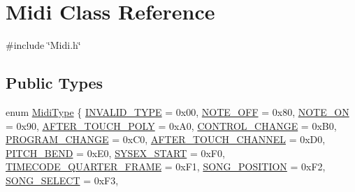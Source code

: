\hypertarget{class_midi}{}\section{Midi Class Reference}
\label{class_midi}


{\ttfamily \#include \char`\"{}Midi.\+h\char`\"{}}

\subsection*{Public Types}
\begin{DoxyCompactItemize}
\item 
enum \hyperlink{class_midi_a968c61c665a5d78a6e7404af956c3cd1}{Midi\+Type} \{ \newline
\hyperlink{class_midi_a968c61c665a5d78a6e7404af956c3cd1af3b6c76b5c392d714412b99e73d9cf71}{I\+N\+V\+A\+L\+I\+D\+\_\+\+T\+Y\+PE} = 0x00, 
\hyperlink{class_midi_a968c61c665a5d78a6e7404af956c3cd1af7549cca7754865b096b1b6078ee67bf}{N\+O\+T\+E\+\_\+\+O\+FF} = 0x80, 
\hyperlink{class_midi_a968c61c665a5d78a6e7404af956c3cd1a6fcbb89fe642571a082ddac8e4405ccf}{N\+O\+T\+E\+\_\+\+ON} = 0x90, 
\hyperlink{class_midi_a968c61c665a5d78a6e7404af956c3cd1a11ecb4bcd9545184a26f8eee155e6696}{A\+F\+T\+E\+R\+\_\+\+T\+O\+U\+C\+H\+\_\+\+P\+O\+LY} = 0x\+A0, 
\newline
\hyperlink{class_midi_a968c61c665a5d78a6e7404af956c3cd1aeea45ff82e000e5533cd742ea7c8749c}{C\+O\+N\+T\+R\+O\+L\+\_\+\+C\+H\+A\+N\+GE} = 0x\+B0, 
\hyperlink{class_midi_a968c61c665a5d78a6e7404af956c3cd1ab83385ec6a1df5600bd7fd209f8dde2e}{P\+R\+O\+G\+R\+A\+M\+\_\+\+C\+H\+A\+N\+GE} = 0x\+C0, 
\hyperlink{class_midi_a968c61c665a5d78a6e7404af956c3cd1a76c88753a2e37d4a33ec1ab5add4e895}{A\+F\+T\+E\+R\+\_\+\+T\+O\+U\+C\+H\+\_\+\+C\+H\+A\+N\+N\+EL} = 0x\+D0, 
\hyperlink{class_midi_a968c61c665a5d78a6e7404af956c3cd1a61c6d3cd43f587b7817eb58b89b0aac5}{P\+I\+T\+C\+H\+\_\+\+B\+E\+ND} = 0x\+E0, 
\newline
\hyperlink{class_midi_a968c61c665a5d78a6e7404af956c3cd1a06f5bad4fef6cffd836f8adc9135de12}{S\+Y\+S\+E\+X\+\_\+\+S\+T\+A\+RT} = 0x\+F0, 
\hyperlink{class_midi_a968c61c665a5d78a6e7404af956c3cd1a62717456ac765769f580fd3569c9dfac}{T\+I\+M\+E\+C\+O\+D\+E\+\_\+\+Q\+U\+A\+R\+T\+E\+R\+\_\+\+F\+R\+A\+ME} = 0x\+F1, 
\hyperlink{class_midi_a968c61c665a5d78a6e7404af956c3cd1ade989a7bcd77623f83bfa79a2a5f09d2}{S\+O\+N\+G\+\_\+\+P\+O\+S\+I\+T\+I\+ON} = 0x\+F2, 
\hyperlink{class_midi_a968c61c665a5d78a6e7404af956c3cd1aace57b1e66f1111d86ff5aa8d9c04cee}{S\+O\+N\+G\+\_\+\+S\+E\+L\+E\+CT} = 0x\+F3, 

\end{DoxyCompactItemize}
